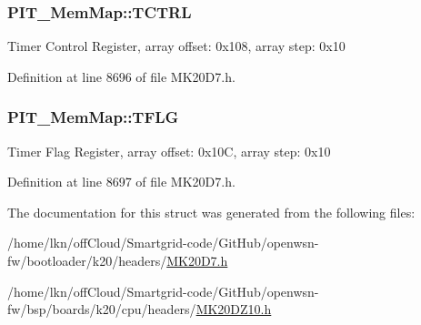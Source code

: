 \subsubsection[{\texorpdfstring{T\+C\+T\+RL}{TCTRL}}]{ P\+I\+T\+\_\+\+Mem\+Map\+::\+T\+C\+T\+RL}\hypertarget{struct_p_i_t___mem_map_a567cdea5c7d615341f95f1438020a7e1}{}\label{struct_p_i_t___mem_map_a567cdea5c7d615341f95f1438020a7e1}
Timer Control Register, array offset\+: 0x108, array step\+: 0x10 

Definition at line 8696 of file M\+K20\+D7.\+h.

\subsubsection[{\texorpdfstring{T\+F\+LG}{TFLG}}]{ P\+I\+T\+\_\+\+Mem\+Map\+::\+T\+F\+LG}\hypertarget{struct_p_i_t___mem_map_add88e740d4ec7a83e66cf9ad79cd027a}{}\label{struct_p_i_t___mem_map_add88e740d4ec7a83e66cf9ad79cd027a}
Timer Flag Register, array offset\+: 0x10C, array step\+: 0x10 

Definition at line 8697 of file M\+K20\+D7.\+h.



The documentation for this struct was generated from the following files\+:\begin{DoxyCompactItemize}
\item 
/home/lkn/off\+Cloud/\+Smartgrid-\/code/\+Git\+Hub/openwsn-\/fw/bootloader/k20/headers/\hyperlink{bootloader_2k20_2headers_2_m_k20_d7_8h}{M\+K20\+D7.\+h}\item 
/home/lkn/off\+Cloud/\+Smartgrid-\/code/\+Git\+Hub/openwsn-\/fw/bsp/boards/k20/cpu/headers/\hyperlink{_m_k20_d_z10_8h}{M\+K20\+D\+Z10.\+h}\end{DoxyCompactItemize}
